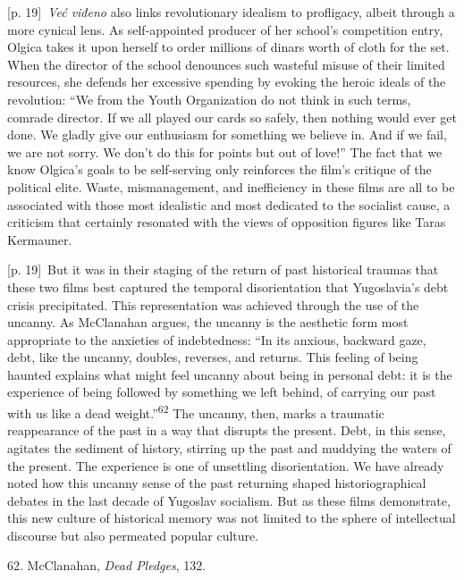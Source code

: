 \documentclass[10pt,a4paper]{article}
\begin{document}
{\scriptsize\color{gray} [p. 19]}\ \textit{Već viđeno} also links revolutionary idealism to profligacy, albeit through a more cynical lens. As self-appointed producer of her school’s competition entry, Olgica takes it upon herself to order millions of dinars worth of cloth for the set. When the director of the school denounces such wasteful misuse of their limited resources, she defends her excessive spending by evoking the heroic ideals of the revolution: “We from the Youth Organization do not think in such terms, comrade director. If we all played our cards so safely, then nothing would ever get done. We gladly give our enthusiasm for something we believe in. And if we fail, we are not sorry. We don’t do this for points but out of love!” The fact that we know Olgica’s goals to be self-serving only reinforces the film’s critique of the political elite. Waste, mismanagement, and inefficiency in these films are all to be associated with those most idealistic and most dedicated to the socialist cause, a criticism that certainly resonated with the views of opposition figures like Taras Kermauner.\par
{\scriptsize\color{gray} [p. 19]}\ But it was in their staging of the return of past historical traumas that these two films best captured the temporal disorientation that Yugoslavia’s debt crisis precipitated. This representation was achieved through the use of the uncanny. As McClanahan argues, the uncanny is the aesthetic form most appropriate to the anxieties of indebtedness: “In its anxious, backward gaze, debt, like the uncanny, doubles, reverses, and returns. This feeling of being haunted explains what might feel uncanny about being in personal debt: it is the experience of being followed by something we left behind, of carrying our past with us like a dead weight.”\nobreak\textsuperscript{62} The uncanny, then, marks a traumatic reappearance of the past in a way that disrupts the present. Debt, in this sense, agitates the sediment of history, stirring up the past and muddying the waters of the present. The experience is one of unsettling disorientation. We have already noted how this uncanny sense of the past returning shaped historiographical debates in the last decade of Yugoslav socialism. But as these films demonstrate, this new culture of historical memory was not limited to the sphere of intellectual discourse but also permeated popular culture.\par{\small 62. McClanahan, \textit{Dead Pledges}, 132.\par}
\end{document}
